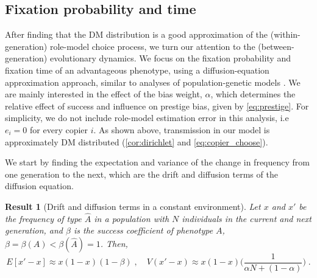 \documentclass[12pt]{extarticle}
\newtheorem{result}{Result}
\begin{document}
\subsection*{Fixation probability and time}

After finding that the DM distribution is a good approximation of the (within-generation) role-model choice process, we turn our attention to the (between-generation) evolutionary dynamics.
We focus on the fixation probability and fixation time of an advantageous phenotype, using a diffusion-equation approximation approach, similar to analyses of population-genetic models \citep{kimura,kimura_average,otto_fixation}.
We are mainly interested in the effect of the bias weight, $\alpha$, which determines the relative effect of success and influence on prestige bias, given by \cref{eq:prestige}.
For simplicity, we do not include role-model estimation error in this analysis, i.e $e_i=0$ for every copier $i$.
As shown above, transmission in our model is approximately DM distributed (\cref{cor:dirichlet} and \cref{eq:copier_choose}).

We start by finding the expectation and variance of the change in frequency from one generation to the next, which are the drift and diffusion terms of the diffusion equation.\\

\begin{result}[Drift and diffusion terms in a constant environment]
Let $x$ and $x'$ be the frequency of type $\hat{A}$ in a population with $N$ individuals in the current and next generation, and  $\beta$ is the success coefficient of phenotype $A$, $\beta = \beta(A) < \beta(\hat{A}) = 1$.
Then,
\begin{equation}
E[x'-x] \approx x(1-x)(1-\beta) \;, 
\quad
V(x'-x) \approx x(1-x)\Big(\frac{1}{\alpha N + (1-\alpha)}\Big) \;.
\end{equation} 
\end{result}
\end{document}
